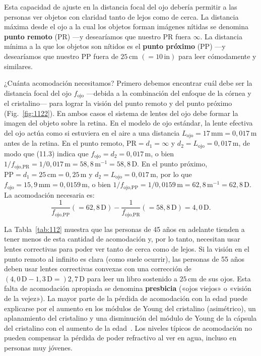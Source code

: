 \documentclass[12pt]{book}
\begin{document}

Esta capacidad de ajuste en la distancia focal del ojo debería permitir a las personas ver objetos con claridad tanto de lejos como de cerca. La distancia máxima desde el ojo a la cual los objetos forman imágenes nítidas se denomina \textbf{punto remoto} (PR) ---y desearíamos que nuestro PR fuera $\infty$. La distancia mínima a la que los objetos son nítidos es el \textbf{punto próximo} (PP) ---y desearíamos que nuestro PP fuera de $25\,\text{cm}$ $(= 10\,\text{in})$ para leer cómodamente y similares.

¿Cuánta acomodación necesitamos? Primero debemos encontrar cuál debe ser la distancia focal del ojo $f_\text{ojo}$ ---debida a la combinación del enfoque de la córnea y el cristalino--- para lograr la visión del punto remoto y del punto próximo (Fig.~\ref{fig:1122}). En ambos casos el sistema de lentes del ojo debe formar la imagen del objeto sobre la retina. En el modelo de ojo estándar, la lente efectiva del ojo actúa como si estuviera en el aire a una distancia $L_\text{ojo} = 17\,\text{mm} = 0{,}017\,\text{m}$ antes de la retina. En el punto remoto, $\text{PR} = d_1 = \infty$ y $d_2 = L_\text{ojo} = 0{,}017\,\text{m}$, de modo que (11.3) indica que $f_\text{ojo} = d_2 = 0{,}017\,\text{m}$, o bien $1/f_{\text{ojo,PR}} = 1/0{,}017\,\text{m} = 58{,}8\,\text{m}^{-1} = 58{,}8\,\text{D}$. En el punto próximo, $\text{PP} = d_1 = 25\,\text{cm} = 0{,}25\,\text{m}$ y $d_2 = L_\text{ojo} = 0{,}017\,\text{m}$, por lo que $f_\text{ojo} = 15{,}9\,\text{mm} = 0{,}0159\,\text{m}$, o bien $1/f_{\text{ojo,PP}} = 1/0{,}0159\,\text{m} = 62{,}8\,\text{m}^{-1} = 62{,}8\,\text{D}$. La acomodación necesaria es:
\begin{equation}
  \frac{1}{f_{\text{ojo,PP}}} (= 62{,}8\,\text{D}) - \frac{1}{f_{\text{ojo,PR}}} (= 58{,}8\,\text{D}) = 4{,}0\,\text{D}.
  \label{eq:11.64}
\end{equation}

La Tabla~\ref{tab:112} muestra que las personas de 45 años en adelante tienden a tener menos de esta cantidad de acomodación y, por lo tanto, necesitan usar lentes correctivas para poder ver tanto de cerca como de lejos. Si la visión en el punto remoto al infinito es clara (como suele ocurrir), las personas de 55 años deben usar lentes correctivas convexas con una corrección de $(4{,}0\,\text{D} - 1{,}3\,\text{D} =) 2{,}7\,\text{D}$ para leer un libro sostenido a $25\,\text{cm}$ de sus ojos. Esta falta de acomodación apropiada se denomina \textbf{presbicia} («ojos viejos» o «visión de la vejez»). La mayor parte de la pérdida de acomodación con la edad puede explicarse por el aumento en los módulos de Young del cristalino (asimétrico), un aplanamiento del cristalino y una disminución del módulo de Young de la cápsula del cristalino con el aumento de la edad~\cite{11}. Los niveles típicos de acomodación no pueden compensar la pérdida de poder refractivo al ver en agua, incluso en personas muy jóvenes.
\end{document}
